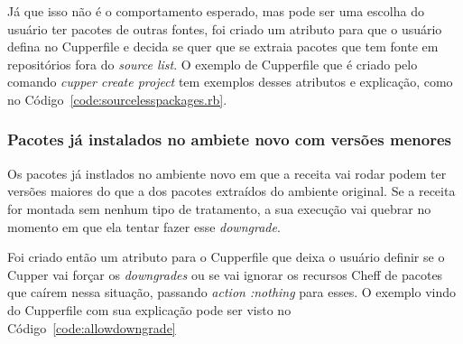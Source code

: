 Já que isso não é o comportamento esperado, mas pode ser uma escolha do usuário
ter pacotes de outras fontes, foi criado um atributo para que o usuário defina no
Cupperfile e decida se quer que se extraia pacotes que tem fonte em repositórios
fora do \textit{source list}. O exemplo de Cupperfile que é criado pelo comando
\textit{cupper create project} tem exemplos desses atributos e explicação, como
no Código~\ref{code:sourcelesspackages.rb}.

\noindent\begin{minipage}{\textwidth}
  \lstset{style=shell}
  
\end{minipage}\hfill

\subsubsection{Pacotes já instalados no ambiete novo com versões menores}
Os pacotes já instlados no ambiente novo em que a receita vai rodar podem ter versões
maiores do que a dos pacotes extraídos do ambiente original. Se a receita for
montada sem nenhum tipo de tratamento, a sua execução vai quebrar no momento
em que ela tentar fazer esse \textit{downgrade}.

Foi criado então um atributo para o Cupperfile que deixa o usuário definir
se o Cupper vai forçar os \textit{downgrades} ou se vai ignorar os recursos
Cheff de pacotes que caírem nessa situação, passando \textit{action :nothing}
para esses. O exemplo vindo do Cupperfile com sua explicação pode ser visto no
Código~\ref{code:allowdowngrade}

\noindent\begin{minipage}{\textwidth}
  \lstset{style=shell}
  
\end{minipage}\hfill
